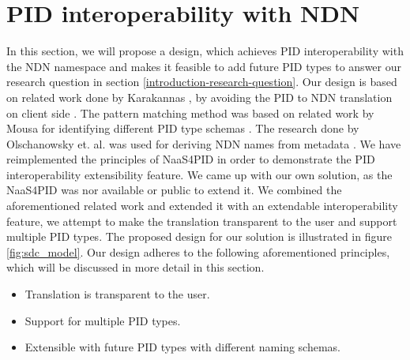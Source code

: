 \section{PID interoperability with NDN}
\label{pid-poc}


In this section, we will propose a design, which achieves PID interoperability with the NDN namespace and makes it feasible to add future PID types to answer our research question in section \ref{introduction-research-question}. Our design is based on related work done by Karakannas \cite{icn-bd}, by avoiding the PID to NDN translation on client side \cite{icn-bd}. The pattern matching method was based on related work by Mousa for identifying different PID type schemas \cite{ndn-app-aware}. The research done by Olschanowsky et. al. was used for deriving NDN names from metadata \cite{ndn-man}.
We have reimplemented the principles of NaaS4PID in order to demonstrate the PID interoperability extensibility feature. We came up with our own solution, as the NaaS4PID was nor available or public to extend it.
We combined the aforementioned related work and extended it with an extendable interoperability feature, we attempt to make the translation transparent to the user and support multiple PID types. The proposed design for our solution is illustrated in figure \ref{fig:sdc_model}.
Our design adheres to the following aforementioned principles, which will be discussed in more detail in this section.
 
\begin{itemize}
    \item{Translation is transparent to the user.}
    \item{Support for multiple PID types.}
    \item{Extensible with future PID types with different naming schemas.}
\end{itemize}

